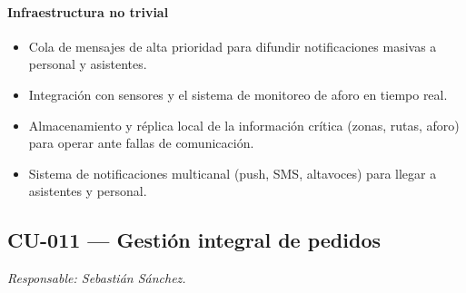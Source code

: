 \paragraph{Infraestructura no trivial}
\begin{itemize}[leftmargin=1.4em, topsep=1pt]
  \item Cola de mensajes de alta prioridad para difundir notificaciones masivas a personal y asistentes.
  \item Integración con sensores y el sistema de monitoreo de aforo en tiempo real.
  \item Almacenamiento y réplica local de la información crítica (zonas, rutas, aforo) para operar ante fallas de comunicación.
  \item Sistema de notificaciones multicanal (push, SMS, altavoces) para llegar a asistentes y personal.
\end{itemize}

\subsection{CU-011 --- Gestión integral de pedidos}
\label{cu:cu-011}
\textit{Responsable: Sebastián Sánchez.}

